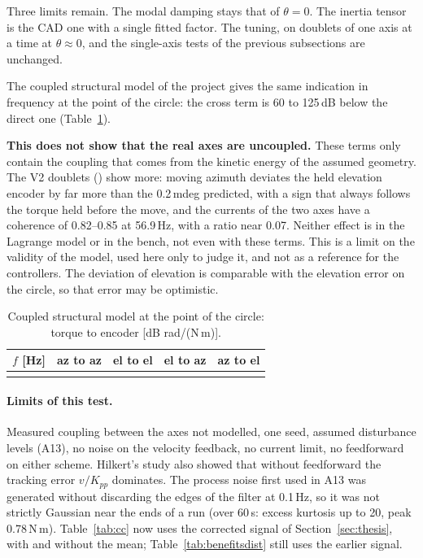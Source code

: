 \documentclass[10pt,a4paper]{article}
\numberwithin{equation}{section}
\begin{document}
Three limits remain. The modal damping stays that of $\theta=0$. The inertia tensor is the CAD one with a single fitted factor. The tuning, on doublets of one axis at a time at $\theta\approx0$, and the single-axis tests of the previous subsections are unchanged.

The coupled structural model of the project gives the same indication in frequency at the point of the circle: the cross term is 60 to 125\,dB below the direct one (Table~\ref{tab:coupling}).

\textbf{This does not show that the real axes are uncoupled.} These terms only contain the coupling that comes from the kinetic energy of the assumed geometry. The V2 doublets () show more: moving azimuth deviates the held elevation encoder by far more than the 0.2\,mdeg predicted, with a sign that always follows the torque held before the move, and the currents of the two axes have a coherence of 0.82--0.85 at 56.9\,Hz, with a ratio near 0.07. Neither effect is in the Lagrange model or in the bench, not even with these terms. This is a limit on the validity of the model, used here only to judge it, and not as a reference for the controllers. The deviation of elevation is comparable with the elevation error on the circle, so that error may be optimistic.

\begin{table}[H]\centering\footnotesize
\caption{Coupled structural model at the point of the circle: torque to encoder [dB rad/(N\,m)].}\label{tab:coupling}
\begin{tabular}{rrrrr}\toprule
$f$ [Hz] & az to az & el to el & el to az & az to el \\ \midrule
\\ \bottomrule
\end{tabular}\end{table}

\paragraph{Limits of this test.} Measured coupling between the axes not modelled, one seed, assumed disturbance levels (A13), no noise on the velocity feedback, no current limit, no feedforward on either scheme. Hilkert's study also showed that without feedforward the tracking error $v/K_{pp}$ dominates. The process noise first used in A13 was generated without discarding the edges of the filter at 0.1\,Hz, so it was not strictly Gaussian near the ends of a run (over 60\,s: excess kurtosis up to 20, peak 0.78\,N\,m). Table~\ref{tab:cc} now uses the corrected signal of Section~\ref{sec:thesis}, with and without the mean; Table~\ref{tab:benefitsdist} still uses the earlier signal.
\end{document}
